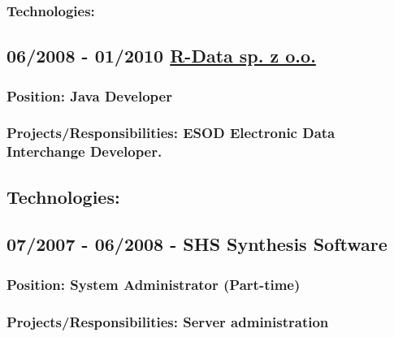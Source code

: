 \documentclass[a4paper]{article}
\begin{document}
\subsubsection* {Technologies:}


\subsection*{06/2008 - 01/2010 \href{www.r-data.pl}{R-Data sp. z o.o.}}

\subsubsection*{Position:  \textcolor[RGB]{140,140,140} {Java Developer}}

\subsubsection*{Projects/Responsibilities: ESOD Electronic Data Interchange Developer.}


\subsection*{Technologies:}

\subsection*{07/2007 - 06/2008 - SHS Synthesis Software}


\subsubsection*{Position:  \textcolor[RGB]{140,140,140} {System Administrator (Part-time)}}


\subsubsection*{Projects/Responsibilities: Server administration}
\end{document}
